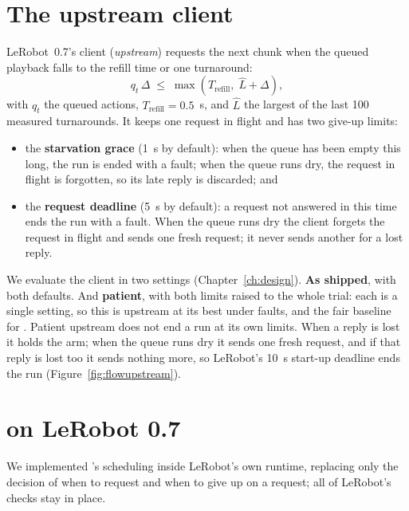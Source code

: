 
\section{The upstream client}\label{sec:baseline}

LeRobot~0.7's client (\emph{upstream}) requests the next chunk when the queued playback falls to the refill time or
one turnaround:
\begin{equation}
  q_t\,\Delta \;\le\; \max\!\left(T_{\mathrm{refill}},\; \hat L + \Delta\right),
\end{equation}
with $q_t$ the queued actions, $T_{\mathrm{refill}}=0.5$~s, and $\hat L$ the largest of the last 100 measured
turnarounds. It keeps one request in flight and has two give-up limits:
\begin{itemize}
\item the \textbf{starvation grace} (1~s by default): when the queue has been empty this long, the run is ended with a
      fault; when the queue runs dry, the request in flight is forgotten, so its late reply is discarded; and
\item the \textbf{request deadline} (5~s by default): a request not answered in this time ends the run with a fault.
      When the queue runs dry the client forgets the request in flight and sends one fresh request; it never sends
      another for a lost reply.
\end{itemize}
We evaluate the client in two settings (Chapter~\ref{ch:design}). \textbf{As shipped}, with both defaults. And
\textbf{patient}, with both limits raised to the whole trial: each is a single setting, so this is upstream at its best
under faults, and the fair baseline for \drtc. Patient upstream does not end a run at its own limits. When a reply is lost it holds the arm; when the
queue runs dry it sends one fresh request, and if that reply is lost too it sends nothing more, so LeRobot's 10~s
start-up deadline ends the run (Figure~\ref{fig:flowupstream}).


\section{\drtc{} on LeRobot 0.7}\label{sec:drtc}

We implemented \drtc's scheduling inside LeRobot's own runtime, replacing only the decision of when to request and
when to give up on a request; all of LeRobot's checks stay in place.

